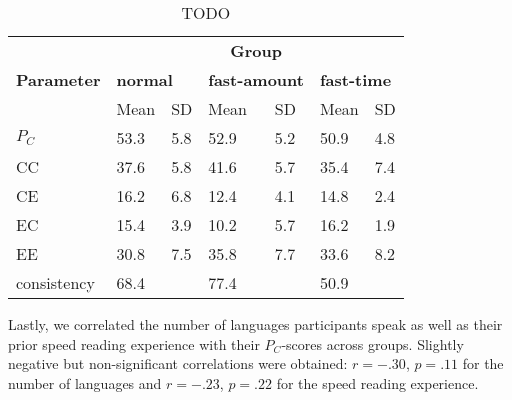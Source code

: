 \begin{table}[h]
\centering
\begin{tabular}{lllllll}
\toprule
& \multicolumn{6}{c}{\textbf{Group}} \\
\cmidrule{2-7}
\textbf{Parameter} & \multicolumn{2}{l}{\textbf{normal}} & \multicolumn{2}{l}{\textbf{fast-amount}} & \multicolumn{2}{l}{\textbf{fast-time}} \\
\midrule
 	    & Mean                       & SD                              & Mean & SD  & Mean & SD \\
\cmidrule(lr{.75em}){2-3}\cmidrule(lr{.75em}){4-5}\cmidrule(lr{.75em}){6-7}
$P_{C}$      & 53.3                       & 5.8                             & 52.9 & 5.2 & 50.9 & 4.8 \\
CC	    & 37.6                       & 5.8                             & 41.6 & 5.7 & 35.4 & 7.4 \\
CE 	    & 16.2                       & 6.8                             & 12.4 & 4.1 & 14.8 & 2.4 \\
EC	    & 15.4                       & 3.9                             & 10.2 & 5.7 & 16.2 & 1.9 \\
EE	    & 30.8                       & 7.5                             & 35.8 & 7.7 & 33.6 & 8.2 \\
consistency & 68.4                       &                                 & 77.4 &     & 50.9 & \\
\bottomrule
\end{tabular}
\caption{TODO}
\end{table}
Lastly, we correlated the number of languages participants speak as well as their prior speed reading experience with their $P_C$-scores across groups. Slightly negative but non-significant correlations were obtained: $r=-.30$, $p=.11$ for the number of languages and $r=-.23$, $p=.22$ for the speed reading experience.
